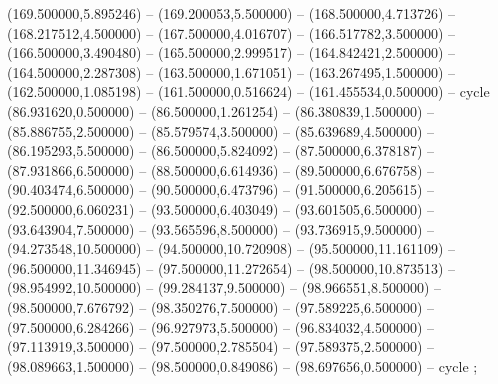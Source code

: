 (169.500000,5.895246) -- (169.200053,5.500000) -- (168.500000,4.713726) -- (168.217512,4.500000) -- (167.500000,4.016707) -- (166.517782,3.500000) -- (166.500000,3.490480) -- (165.500000,2.999517) -- (164.842421,2.500000) -- (164.500000,2.287308) -- (163.500000,1.671051) -- (163.267495,1.500000) -- (162.500000,1.085198) -- (161.500000,0.516624) -- (161.455534,0.500000) -- cycle
   (86.931620,0.500000) -- (86.500000,1.261254) -- (86.380839,1.500000) -- (85.886755,2.500000) -- (85.579574,3.500000) -- (85.639689,4.500000) -- (86.195293,5.500000) -- (86.500000,5.824092) -- (87.500000,6.378187) -- (87.931866,6.500000) -- (88.500000,6.614936) -- (89.500000,6.676758) -- (90.403474,6.500000) -- (90.500000,6.473796) -- (91.500000,6.205615) -- (92.500000,6.060231) -- (93.500000,6.403049) -- (93.601505,6.500000) -- (93.643904,7.500000) -- (93.565596,8.500000) -- (93.736915,9.500000) -- (94.273548,10.500000) -- (94.500000,10.720908) -- (95.500000,11.161109) -- (96.500000,11.346945) -- (97.500000,11.272654) -- (98.500000,10.873513) -- (98.954992,10.500000) -- (99.284137,9.500000) -- (98.966551,8.500000) -- (98.500000,7.676792) -- (98.350276,7.500000) -- (97.589225,6.500000) -- (97.500000,6.284266) -- (96.927973,5.500000) -- (96.834032,4.500000) -- (97.113919,3.500000) -- (97.500000,2.785504) -- (97.589375,2.500000) -- (98.089663,1.500000) -- (98.500000,0.849086) -- (98.697656,0.500000) -- cycle
   ;
